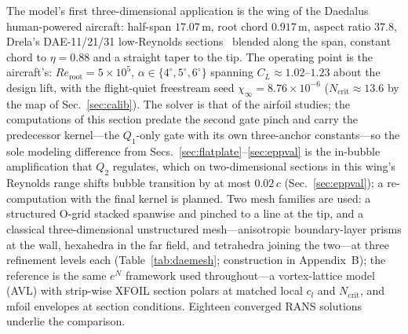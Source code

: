 \documentclass[journal]{new-aiaa}
\begin{document}
The model's first three-dimensional application is the wing of the
Daedalus human-powered aircraft: half-span $17.07\,$m, root chord
$0.917\,$m, aspect ratio $37.8$, Drela's DAE-11/21/31 low-Reynolds
sections~\cite{drela_daedalus_1988} blended along the span, constant
chord to $\eta\!=\!0.88$ and a straight taper to the tip. The operating
point is the aircraft's: $Re_\mathrm{root}\!=\!5\!\times\!10^5$,
$\alpha\!\in\!\{4^\circ,5^\circ,6^\circ\}$ spanning
$C_L\!\approx\!1.02$--$1.23$ about the design lift, with the flight-quiet
freestream seed $\chi_\infty\!=\!8.76\!\times\!10^{-6}$
($N_\mathrm{crit}\!\approx\!13.6$ by the map of
Sec.~\ref{sec:calib}). The solver is that of the airfoil studies; the
computations of this section predate the second gate pinch and carry
the predecessor kernel---the $Q_1$-only gate with its own three-anchor
constants---so the sole modeling difference from
Secs.~\ref{sec:flatplate}--\ref{sec:eppval} is the in-bubble
amplification that $Q_2$ regulates, which on two-dimensional sections
in this wing's Reynolds range shifts bubble transition by at most
$0.02\,c$ (Sec.~\ref{sec:eppval}); a re-computation with the final
kernel is planned. Two mesh families are used: a structured O-grid
stacked spanwise and pinched to a line at the tip, and a classical
three-dimensional unstructured mesh---anisotropic boundary-layer
prisms at the wall, hexahedra in the far field, and tetrahedra joining
the two---at three refinement levels each
(Table~\ref{tab:daemesh}; construction in Appendix~B); the reference
is the same $e^N$ framework
used throughout---a vortex-lattice model (AVL) with strip-wise XFOIL
section polars at matched
local $c_l$ and $N_\mathrm{crit}$, and mfoil envelopes at section
conditions. Eighteen converged RANS solutions underlie the comparison.
\end{document}
